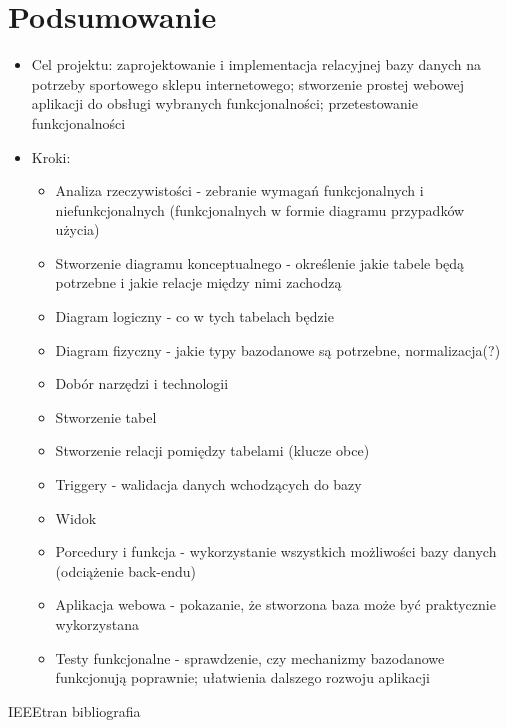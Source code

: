 \documentclass[a4paper, 12pt]{article}
\begin{document}
\section{Podsumowanie}
\begin{itemize}
	\item Cel projektu: zaprojektowanie i implementacja relacyjnej bazy danych na potrzeby sportowego sklepu internetowego; stworzenie prostej webowej aplikacji do obsługi wybranych funkcjonalności; przetestowanie funkcjonalności
	\item Kroki:
		\begin{itemize}
		\item Analiza rzeczywistości - zebranie wymagań funkcjonalnych i niefunkcjonalnych (funkcjonalnych w formie diagramu przypadków użycia)		
		\item Stworzenie diagramu konceptualnego - określenie jakie tabele będą potrzebne i jakie relacje między nimi zachodzą
		\item Diagram logiczny - co w tych tabelach będzie
		\item Diagram fizyczny - jakie typy bazodanowe są potrzebne, normalizacja(?)
		\item Dobór narzędzi i technologii
		\item Stworzenie tabel
		\item Stworzenie relacji pomiędzy tabelami (klucze obce)
		\item Triggery - walidacja danych wchodzących do bazy
		\item Widok
		\item Porcedury i funkcja - wykorzystanie wszystkich możliwości bazy danych (odciążenie back-endu)
		\item Aplikacja webowa - pokazanie, że stworzona baza może być praktycznie wykorzystana
		\item Testy funkcjonalne - sprawdzenie, czy mechanizmy bazodanowe funkcjonują poprawnie; ułatwienia dalszego rozwoju aplikacji
\end{itemize}		  
\end{itemize}
\cleardoublepage
{}
 {IEEEtran}
 {bibliografia}
\nocite {*}
\end{document}

